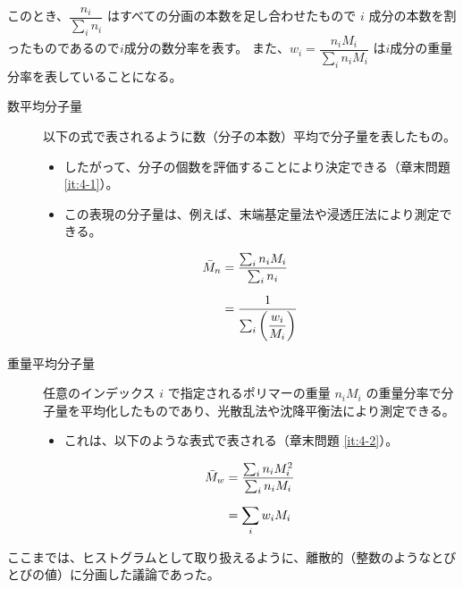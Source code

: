 \documentclass[a4paper,11pt]{ltjsarticle}
\begin{document}
このとき、$\dfrac{n_i}{\sum_i n_i}$ はすべての分画の本数を足し合わせたもので $i$ 成分の本数を割ったものであるので$i$成分の数分率を表す。
また、$w_i=\dfrac{n_i M_i}{\sum_i n_i M_i}$ は$i$成分の重量分率を表していることになる。

\begin{description}
	\item[数平均分子量] 以下の式で表されるように数（分子の本数）平均で分子量を表したもの。
	\begin{itemize}
		\item したがって、分子の個数を評価することにより決定できる（章末問題 \ref{it:4-1}）。
		\item この表現の分子量は、例えば、末端基定量法や浸透圧法により測定できる。
	\end{itemize}
		\begin{align}
		{\bar M}_n 
			&= \dfrac{\sum_i n_i M_i}{\sum_i n_i} \notag \\[6pt]
			&= \dfrac{1}{\sum_i \left(\dfrac{w_i}{M_i} \right)}
		\label{eq:Mn}
		\end{align}

\item[重量平均分子量] 任意のインデックス $i$ で指定されるポリマーの重量 $n_i M_i$ の重量分率で分子量を平均化したものであり、光散乱法や沈降平衡法により測定できる。
		\begin{itemize}
			\item これは、以下のような表式で表される（章末問題 \ref{it:4-2}）。
		\end{itemize}
		\begin{align}
		{\bar M}_w 
			&= \dfrac{\sum_i n_i M_i^2}{\sum_i n_i M_i}\notag \\[6pt]
			&= \displaystyle \sum_i w_i M_i
		\label{eq:Mw}
		\end{align}
\end{description}

ここまでは、ヒストグラムとして取り扱えるように、離散的（整数のようなとびとびの値）に分画した議論であった。
\end{document}
